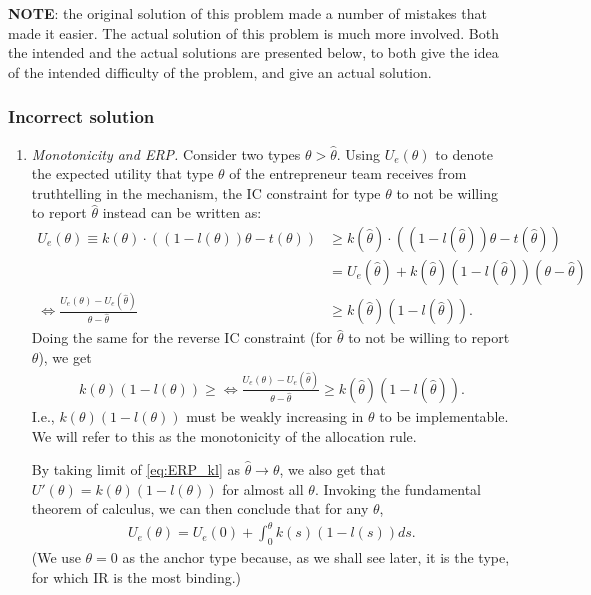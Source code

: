 \documentclass[a4paper]{article}
\begin{document}
	\textbf{NOTE}: the original solution of this problem made a number of mistakes that made it easier. The actual solution of this problem is much more involved. Both the intended and the actual solutions are presented below, to both give the idea of the intended difficulty of the problem, and give an actual solution.
	
	
	\subsubsection*{Incorrect solution}
	\begin{enumerate}
		\item \emph{Monotonicity and ERP.} Consider two types $\theta > \hat{\theta}$. Using $U_e(\theta)$ to denote the expected utility that type $\theta$ of the entrepreneur team receives from truthtelling in the mechanism, the IC constraint for type $\theta$ to not be willing to report $\hat{\theta}$ instead can be written as:
		\begin{align*}
			U_e(\theta) \equiv k(\theta) \cdot \left( (1-l(\theta)) \theta - t(\theta) \right)
			& \geq 
			k(\hat{\theta}) \cdot \left( (1-l(\hat{\theta})) \theta - t(\hat{\theta}) \right)
			\\
			& = U_e(\hat{\theta}) + k(\hat{\theta}) (1-l(\hat{\theta})) (\theta -\hat{\theta})
			\\
			\Leftrightarrow \frac{U_e(\theta)-U_e(\hat{\theta})}{\theta-\hat{\theta}} & \geq k(\hat{\theta}) (1-l(\hat{\theta})).
		\end{align*}
		Doing the same for the reverse IC constraint (for $\hat{\theta}$ to not be willing to report $\theta$), we get
		\begin{align}
			k({\theta}) (1-l({\theta})) \geq \Leftrightarrow \frac{U_e(\theta)-U_e(\hat{\theta})}{\theta-\hat{\theta}} \geq k(\hat{\theta}) (1-l(\hat{\theta})).
			\label{eq:ERP_kl}
		\end{align}
		I.e., $k(\theta)(1-l(\theta))$ must be weakly increasing in $\theta$ to be implementable. We will refer to this as the monotonicity of the allocation rule.
		
		By taking limit of \eqref{eq:ERP_kl} as $\hat{\theta}\to \theta$, we also get that $U'(\theta) = k(\theta) (1-l(\theta))$ for almost all $\theta$. Invoking the fundamental theorem of calculus, we can then conclude that for any $\theta$,
		\begin{align}
			U_e(\theta) = U_e(0) + \int_0^\theta k(s) (1-l(s)) ds.
			\label{eq:ERP_kl2}
		\end{align}
		(We use $\theta=0$ as the anchor type because, as we shall see later, it is the type, for which IR is the most binding.)
		

\end{enumerate}
\end{document}
